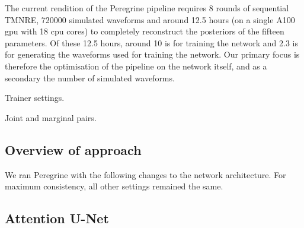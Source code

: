 
The current rendition of the Peregrine pipeline requires 8 rounds of sequential TMNRE, 720000 simulated waveforms and around 12.5 hours (on a single A100 gpu with 18 cpu cores) to completely reconstruct the posteriors of the fifteen parameters. Of these 12.5 hours, around 10 is for training the network and 2.3 is for generating the waveforms used for training the network. Our primary focus is therefore the optimisation of the pipeline on the network itself, and as a secondary the number of simulated waveforms.

Trainer settings.

Joint and marginal pairs.

\subsection{Overview of approach}

We ran Peregrine with the following changes to the network architecture. For maximum consistency, all other settings remained the same. 

\subsection{Attention U-Net}


